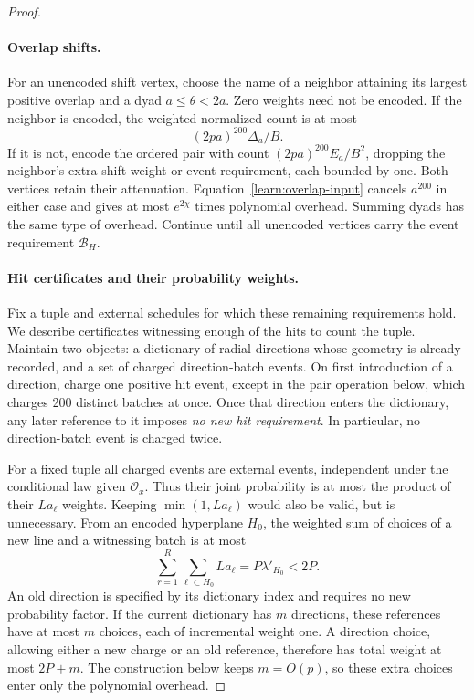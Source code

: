 \begin{proof}
\paragraph{Overlap shifts.}
For an unencoded shift vertex, choose the name of a neighbor attaining
its largest positive overlap and a dyad $a\le\theta<2a$. Zero weights
need not be encoded. If the neighbor is encoded, the weighted normalized
count is at most
\[
 (2pa)^{200}\Delta_a/B.
\]
If it is not, encode the ordered pair with count
$(2pa)^{200}E_a/B^2$, dropping the neighbor's extra shift weight or
event requirement, each bounded by one. Both vertices retain their
attenuation. Equation~\eqref{learn:overlap-input} cancels $a^{200}$
in either case and gives at most $e^{2\chi}$ times polynomial overhead.
Summing dyads has the same type of overhead. Continue until all
unencoded vertices carry the event requirement $\mathcal B_H$.

\paragraph{Hit certificates and their probability weights.}
Fix a tuple and external schedules for which these remaining requirements
hold. We describe certificates witnessing enough of the hits to count
the tuple. Maintain two objects: a dictionary of radial directions whose
geometry is already recorded, and a set of charged direction-batch
events. On first introduction of a direction, charge one positive hit
event, except in the pair operation below, which charges 200 distinct
batches at once. Once that direction enters the dictionary, any later
reference to it imposes \emph{no new hit requirement}. In particular,
no direction-batch event is charged twice.

For a fixed tuple all charged events are external events, independent
under the conditional law given $\mathcal O_x$. Thus their joint
probability is at most the product of their $La_\ell$ weights. Keeping
$\min(1,La_\ell)$ would also be valid, but is unnecessary. From an
encoded hyperplane $H_0$, the weighted sum of choices of a new line
and a witnessing batch is at most
\begin{equation}\label{learn:line-charge}
 \sum_{r=1}^R\sum_{\ell\subset H_0}La_\ell
 =P\lambda'_{H_0}<2P.
\end{equation}
An old direction is specified by its dictionary index and requires no
new probability factor. If the current dictionary has $m$ directions,
these references have at most $m$ choices, each of incremental weight
one. A direction choice, allowing either a new charge or an old
reference, therefore has total weight at most $2P+m$. The construction
below keeps $m=O(p)$, so these extra choices enter only the polynomial
overhead.


\end{proof}
